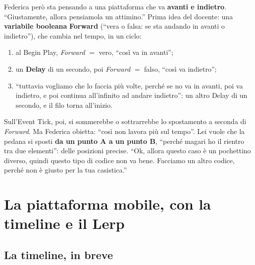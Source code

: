 Federica però sta pensando a una piattaforma che va \textbf{avanti e indietro}.
``Giustamente, allora pensiamola un attimino.'' Prima idea del docente: una
\textbf{variabile booleana} \textbf{Forward} (``vera o falsa: se sta andando in
avanti o indietro''), che cambia nel tempo, in un ciclo:
\begin{enumerate}
  \item al Begin Play, \emph{Forward} $=$ vero, ``così va in avanti'';
  \item un \textbf{Delay} di un secondo, poi \emph{Forward} $=$ falso, ``così va
        indietro'';
  \item ``tuttavia vogliamo che lo faccia più volte, perché se no va in avanti,
        poi va indietro, e poi continua all'infinito ad andare indietro'':
        un altro Delay di un secondo, e il filo torna all'inizio.
\end{enumerate}
Sull'Event Tick, poi, si sommerebbe o sottrarrebbe lo spostamento a seconda di
\emph{Forward}. Ma Federica obietta: ``così non lavora più sul tempo''. Lei vuole
che la pedana si sposti \textbf{da un punto A a un punto B}, ``perché magari ho
il rientro tra due elementi'': delle posizioni precise. ``Ok, allora questo caso
è un pochettino diverso, quindi questo tipo di codice non va bene. Facciamo un
altro codice, perché non è giusto per la tua casistica.''

\section{La piattaforma mobile, con la timeline e il Lerp}
\label{gd13:sec:piattaforma-timeline}

\subsection{La timeline, in breve}

